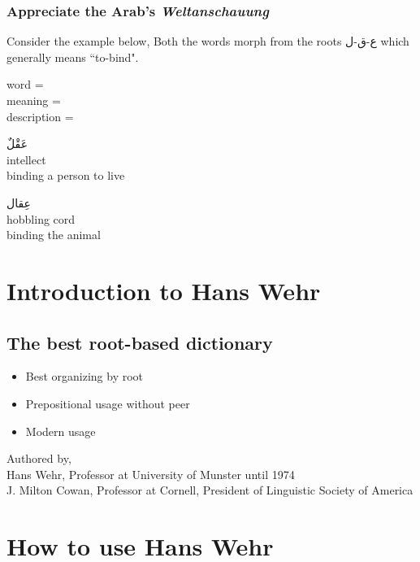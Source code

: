 \subsubsection{Appreciate the Arab's \textit{Weltanschauung}}
Consider the example below, Both the words morph from the roots 
\textarabic{ع-ق-ل}
which generally means ``\textarabic{to-bind}". \\


\begin{minipage}{.33\textwidth}
	word = \\ meaning = \\ description =
\end{minipage} 
\begin{minipage}{.33\textwidth}
	\textarabic{عَقْلٌ} \\ intellect \\ binding a person to live
\end{minipage}
\begin{minipage}{.33\textwidth}
	\textarabic{عِقال} \\ hobbling cord \\ binding the animal
\end{minipage}

%


\section{Introduction to Hans Wehr}
\subsection{The best root-based dictionary}
\begin{itemize}	    \setlength{\itemsep}{5pt}
	\item Best organizing by root
	\item Prepositional usage without peer
	\item Modern usage	
\end{itemize}
\noindent Authored by, \\
Hans Wehr, Professor at University of Munster until 1974 \\
J. Milton Cowan, Professor at Cornell, President of Linguistic Society of America

\section{How to use Hans Wehr}
